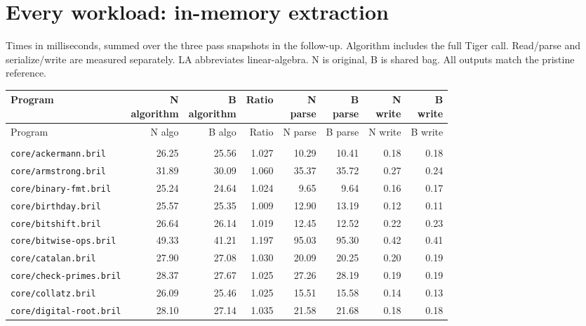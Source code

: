 \section{Every workload: in-memory extraction}
Times in milliseconds, summed over the three pass snapshots in the follow-up. Algorithm includes the full Tiger call. Read/parse and serialize/write are measured separately. LA abbreviates linear-algebra. N is original, B is shared bag. All outputs match the pristine reference.
\begingroup\small\setlength{\tabcolsep}{3pt}
\begin{longtable}{p{48mm}rrrrrrr}
\toprule Program & \shortstack{N\\algorithm} & \shortstack{B\\algorithm} & Ratio & \shortstack{N\\parse} & \shortstack{B\\parse} & \shortstack{N\\write} & \shortstack{B\\write}\\\midrule\endfirsthead
\toprule Program & N algo & B algo & Ratio & N parse & B parse & N write & B write\\\midrule\endhead
\bottomrule\endfoot
\multicolumn{8}{l}{\textbf{Bril}}\\*
\nolinkurl{core/ackermann.bril} & 26.25 & 25.56 & 1.027 & 10.29 & 10.41 & 0.18 & 0.18 \\
\nolinkurl{core/armstrong.bril} & 31.89 & 30.09 & 1.060 & 35.37 & 35.72 & 0.27 & 0.24 \\
\nolinkurl{core/binary-fmt.bril} & 25.24 & 24.64 & 1.024 & 9.65 & 9.64 & 0.16 & 0.17 \\
\nolinkurl{core/birthday.bril} & 25.57 & 25.35 & 1.009 & 12.90 & 13.19 & 0.12 & 0.11 \\
\nolinkurl{core/bitshift.bril} & 26.64 & 26.14 & 1.019 & 12.45 & 12.52 & 0.22 & 0.23 \\
\nolinkurl{core/bitwise-ops.bril} & 49.33 & 41.21 & 1.197 & 95.03 & 95.30 & 0.42 & 0.41 \\
\nolinkurl{core/catalan.bril} & 27.90 & 27.08 & 1.030 & 20.09 & 20.25 & 0.20 & 0.19 \\
\nolinkurl{core/check-primes.bril} & 28.37 & 27.67 & 1.025 & 27.26 & 28.19 & 0.19 & 0.19 \\
\nolinkurl{core/collatz.bril} & 26.09 & 25.46 & 1.025 & 15.51 & 15.58 & 0.14 & 0.13 \\
\nolinkurl{core/digital-root.bril} & 28.10 & 27.14 & 1.035 & 21.58 & 21.68 & 0.18 & 0.18 \\

\end{longtable}
